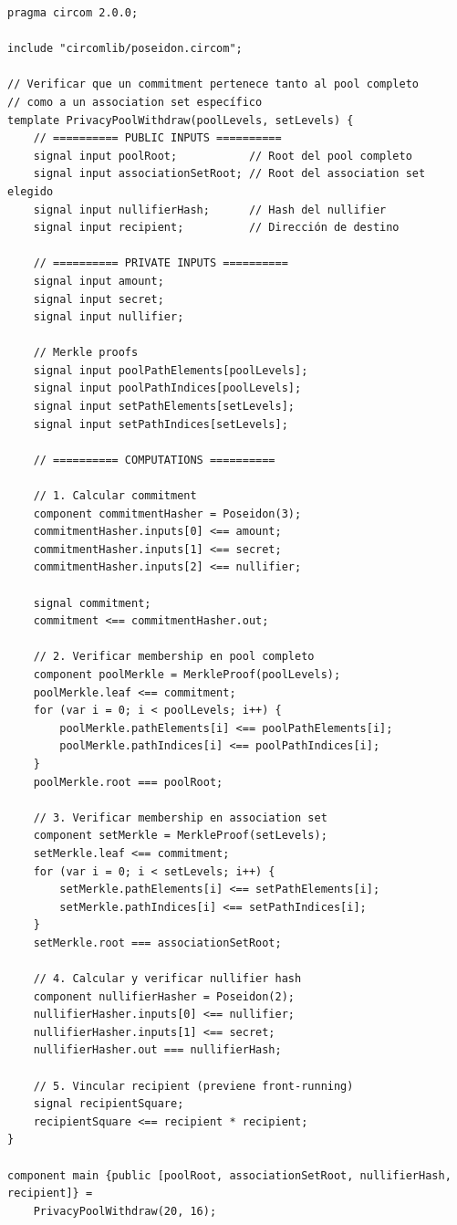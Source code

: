 \documentclass[11pt,a4paper,twoside]{book}
\theoremstyle{definition}
\theoremstyle{remark}
\begin{document}
\begin{lstlisting}[language=circom, caption={Circuito de Privacy Pools}]
pragma circom 2.0.0;

include "circomlib/poseidon.circom";

// Verificar que un commitment pertenece tanto al pool completo
// como a un association set específico
template PrivacyPoolWithdraw(poolLevels, setLevels) {
    // ========== PUBLIC INPUTS ==========
    signal input poolRoot;           // Root del pool completo
    signal input associationSetRoot; // Root del association set elegido
    signal input nullifierHash;      // Hash del nullifier
    signal input recipient;          // Dirección de destino
    
    // ========== PRIVATE INPUTS ==========
    signal input amount;
    signal input secret;
    signal input nullifier;
    
    // Merkle proofs
    signal input poolPathElements[poolLevels];
    signal input poolPathIndices[poolLevels];
    signal input setPathElements[setLevels];
    signal input setPathIndices[setLevels];
    
    // ========== COMPUTATIONS ==========
    
    // 1. Calcular commitment
    component commitmentHasher = Poseidon(3);
    commitmentHasher.inputs[0] <== amount;
    commitmentHasher.inputs[1] <== secret;
    commitmentHasher.inputs[2] <== nullifier;
    
    signal commitment;
    commitment <== commitmentHasher.out;
    
    // 2. Verificar membership en pool completo
    component poolMerkle = MerkleProof(poolLevels);
    poolMerkle.leaf <== commitment;
    for (var i = 0; i < poolLevels; i++) {
        poolMerkle.pathElements[i] <== poolPathElements[i];
        poolMerkle.pathIndices[i] <== poolPathIndices[i];
    }
    poolMerkle.root === poolRoot;
    
    // 3. Verificar membership en association set
    component setMerkle = MerkleProof(setLevels);
    setMerkle.leaf <== commitment;
    for (var i = 0; i < setLevels; i++) {
        setMerkle.pathElements[i] <== setPathElements[i];
        setMerkle.pathIndices[i] <== setPathIndices[i];
    }
    setMerkle.root === associationSetRoot;
    
    // 4. Calcular y verificar nullifier hash
    component nullifierHasher = Poseidon(2);
    nullifierHasher.inputs[0] <== nullifier;
    nullifierHasher.inputs[1] <== secret;
    nullifierHasher.out === nullifierHash;
    
    // 5. Vincular recipient (previene front-running)
    signal recipientSquare;
    recipientSquare <== recipient * recipient;
}

component main {public [poolRoot, associationSetRoot, nullifierHash, recipient]} = 
    PrivacyPoolWithdraw(20, 16);
\end{lstlisting}
\end{document}
